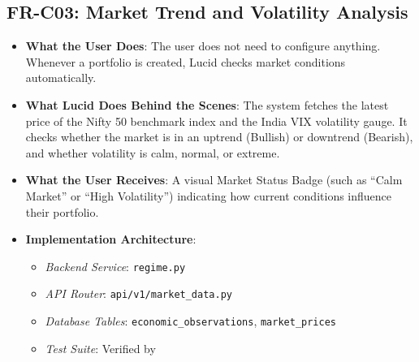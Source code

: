\subsection{FR-C03: Market Trend and Volatility Analysis}
\begin{itemize}
    \item \textbf{What the User Does}: The user does not need to configure anything. Whenever a portfolio is created, Lucid checks market conditions automatically.
    \item \textbf{What Lucid Does Behind the Scenes}: The system fetches the latest price of the Nifty 50 benchmark index and the India VIX volatility gauge. It checks whether the market is in an uptrend (Bullish) or downtrend (Bearish), and whether volatility is calm, normal, or extreme.
    \item \textbf{What the User Receives}: A visual Market Status Badge (such as ``Calm Market'' or ``High Volatility'') indicating how current conditions influence their portfolio.
    \item \textbf{Implementation Architecture}:
    \begin{itemize}
        \item \textit{Backend Service}: \texttt{regime.py}
        \item \textit{API Router}: \texttt{api/v1/market\_data.py}
        \item \textit{Database Tables}: \texttt{economic\_observations}, \texttt{market\_prices}
        \item \textit{Test Suite}: Verified by 
    \end{itemize}
\end{itemize}

